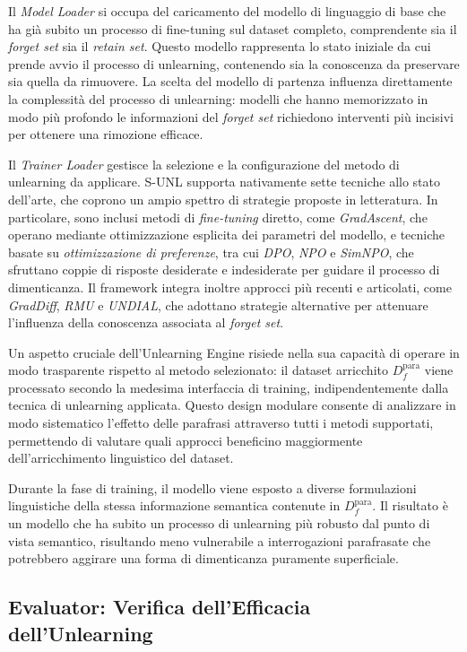 Il \textit{Model Loader} si occupa del caricamento del modello di linguaggio di base che ha già subito un processo di fine-tuning sul dataset completo, comprendente sia il \emph{forget set} sia il \emph{retain set}. Questo modello rappresenta lo stato iniziale da cui prende avvio il processo di unlearning, contenendo sia la conoscenza da preservare sia quella da rimuovere. La scelta del modello di partenza influenza direttamente la complessità del processo di unlearning: modelli che hanno memorizzato in modo più profondo le informazioni del \emph{forget set} richiedono interventi più incisivi per ottenere una rimozione efficace.

Il \textit{Trainer Loader} gestisce la selezione e la configurazione del metodo di unlearning da applicare. S-UNL supporta nativamente sette tecniche allo stato dell’arte, che coprono un ampio spettro di strategie proposte in letteratura. In particolare, sono inclusi metodi di \textit{fine-tuning} diretto, come \emph{GradAscent}, che operano mediante ottimizzazione esplicita dei parametri del modello, e tecniche basate su \textit{ottimizzazione di preferenze}, tra cui \emph{DPO}, \emph{NPO} e \emph{SimNPO}, che sfruttano coppie di risposte desiderate e indesiderate per guidare il processo di dimenticanza. Il framework integra inoltre approcci più recenti e articolati, come \emph{GradDiff}, \emph{RMU} e \emph{UNDIAL}, che adottano strategie alternative per attenuare l’influenza della conoscenza associata al \emph{forget set}.

Un aspetto cruciale dell’Unlearning Engine risiede nella sua capacità di operare in modo trasparente rispetto al metodo selezionato: il dataset arricchito $D_f^{\text{para}}$ viene processato secondo la medesima interfaccia di training, indipendentemente dalla tecnica di unlearning applicata. Questo design modulare consente di analizzare in modo sistematico l’effetto delle parafrasi attraverso tutti i metodi supportati, permettendo di valutare quali approcci beneficino maggiormente dell’arricchimento linguistico del dataset.

Durante la fase di training, il modello viene esposto a diverse formulazioni linguistiche della stessa informazione semantica contenute in $D_f^{\text{para}}$. Il risultato è un modello che ha subito un processo di unlearning più robusto dal punto di vista semantico, risultando meno vulnerabile a interrogazioni parafrasate che potrebbero aggirare una forma di dimenticanza puramente superficiale.

\subsection{Evaluator: Verifica dell'Efficacia dell'Unlearning}

